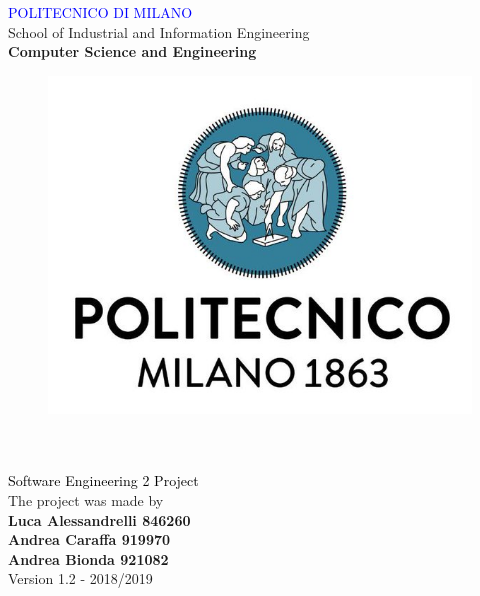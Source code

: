 
\usepackage[dvipsnames]{xcolor}
\usepackage{listings}
\usepackage{alloy-style}
\usepackage{placeins}
\usepackage{graphicx,color,listings}
\usepackage{float}
\usepackage[export]{adjustbox}
\usepackage{hyperref}%
\hypersetup{%
  colorlinks = true,
  linkcolor  = black
}
\usepackage{sectsty}
\usepackage{enumitem}
\usepackage[english]{babel}
\usepackage{booktabs}
\usepackage{xcolor}


\sectionfont{\huge}
\subsectionfont{\LARGE}
\subsubsectionfont{\Large}








\begin{titlepage}

\centering
{\textcolor{Blue}{\LARGE  {POLITECNICO DI MILANO}}}\\[0.5CM]
\Large {School of Industrial and Information Engineering}\\[0.3CM]
\textbf{\Large Computer Science and Engineering}\\
[1cm]
\begin{figure}[H]
\centering
\includegraphics[scale = 0.3]{Images/Logo/logo.jpg}\\
[1cm]
\end{figure}
{\fontsize{35}{35} }\\[0.5cm]
{\fontsize{25}{70} }\\[0.5cm]     
{\textcolor{Black}{\LARGE{Software Engineering 2 Project}}}\\ [2cm]     
\centering
The project was made by\\[0.5cm]
\textbf {\LARGE Luca Alessandrelli 846260}\\[0.2cm]
\textbf {\LARGE Andrea Caraffa 919970}\\[0.2cm]
\textbf {\LARGE Andrea Bionda 921082}\\[0.5cm]
Version 1.2  -  2018/2019
\end{titlepage}

